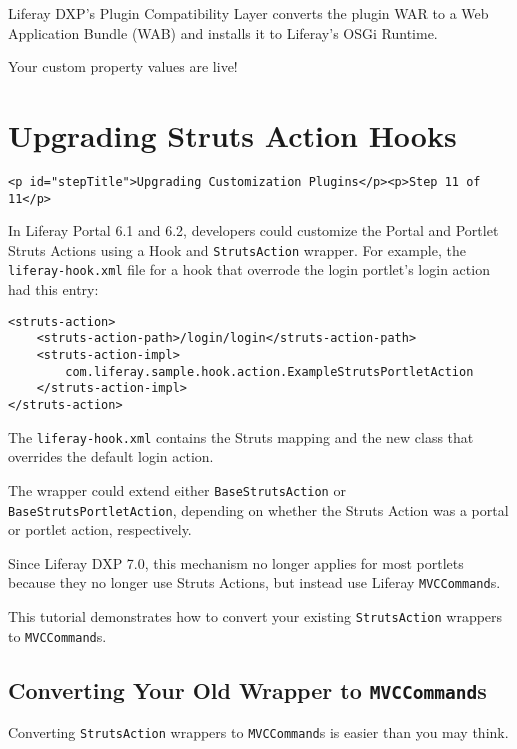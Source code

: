 Liferay DXP's Plugin Compatibility Layer converts the plugin WAR to a
Web Application Bundle (WAB) and installs it to Liferay's OSGi Runtime.

Your custom property values are live!

\chapter{Upgrading Struts Action
Hooks}\label{upgrading-struts-action-hooks}

\begin{verbatim}
<p id="stepTitle">Upgrading Customization Plugins</p><p>Step 11 of 11</p>
\end{verbatim}

In Liferay Portal 6.1 and 6.2, developers could customize the Portal and
Portlet Struts Actions using a Hook and \texttt{StrutsAction} wrapper.
For example, the \texttt{liferay-hook.xml} file for a hook that overrode
the login portlet's login action had this entry:

\begin{verbatim}
<struts-action>
    <struts-action-path>/login/login</struts-action-path>
    <struts-action-impl>
        com.liferay.sample.hook.action.ExampleStrutsPortletAction
    </struts-action-impl>
</struts-action>
\end{verbatim}

The \texttt{liferay-hook.xml} contains the Struts mapping and the new
class that overrides the default login action.

The wrapper could extend either \texttt{BaseStrutsAction} or
\texttt{BaseStrutsPortletAction}, depending on whether the Struts Action
was a portal or portlet action, respectively.

Since Liferay DXP 7.0, this mechanism no longer applies for most
portlets because they no longer use Struts Actions, but instead use
Liferay \texttt{MVCCommand}s.

This tutorial demonstrates how to convert your existing
\texttt{StrutsAction} wrappers to \texttt{MVCCommand}s.

\section{\texorpdfstring{Converting Your Old Wrapper to
\texttt{MVCCommand}s}{Converting Your Old Wrapper to MVCCommands}}\label{converting-your-old-wrapper-to-mvccommands}

Converting \texttt{StrutsAction} wrappers to \texttt{MVCCommand}s is
easier than you may think.

